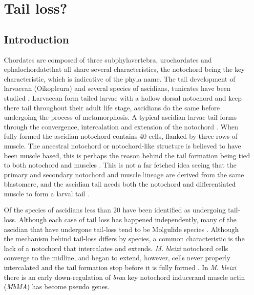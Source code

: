 \chapter{Tail loss?}

\section{Introduction}


Chordates are composed of three subphyla\textemdash vertebra, urochordates and ephalochordate\textemdash that all share several characteristics, the notochord being the key characteristic, which is indicative of the phyla name. The tail development of larvacean (Oikopleura) and several species of ascidians, tunicates have been studied \cite{jeffery_factors_1992,nakatani_mutations_1999,kugler_evolutionary_2011}. Larvacean form tailed larvae with a hollow dorsal notochord and keep there tail throughout their adult life stage, ascidians do the same before undergoing the process of metamorphosis. A typical ascidian larvae tail forms through the convergence, intercalation and extension of the notochord \cite{swalla_mechanisms_1993}. When fully formed the ascidian notochord contains 40 cells, flanked by three rows of muscle. The ancestral notochord or notochord-like structure is believed to have been muscle based, this is perhaps the reason behind the tail formation being tied to both notochord and muscles \cite{lauri_development_2014}. This is not a far fetched idea seeing that the primary and secondary notochord and muscle lineage are derived from the same blastomere, and the ascidian tail needs both the notochord and differentiated muscle to form a larval tail \cite{nishida_cell_1987,di_gregorio_tail_2002}.

Of the  species of ascidians less than 20 have been identified as undergoing tail-loss. Although each case of tail loss has happened independently, many of the ascidian that have undergone tail-loss tend to be Molgulide species \cite{berrill_studies_1931,huber_evolution_2000}. Although the mechanism behind tail-loss differs by species, a common characteristic is the lack of a notochord that intercalates and extends. \textit{M. bleizi} notochord cells converge to the midline, and began to extend, however, cells never properly intercalated and the tail formation stop before it is fully formed \cite{jeffery_evolution_1999}. In \textit{M. bleizi} there is an early down-regulation of \textit{bra}\textemdash a key notochord inducer\textemdash and muscle actin (\textit{MbMA}) has become pseudo genes.   

